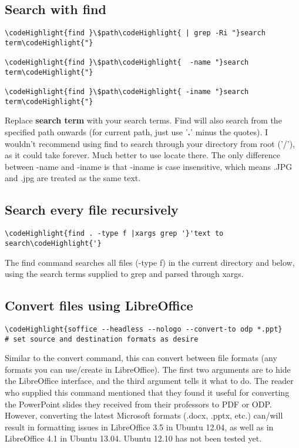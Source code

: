 \documentclass[12pt,a4paper]{article}
\begin{document}
\subsection{Search with find}
\begin{Verbatim}[commandchars=\\\{\}]
\codeHighlight{find }\$path\codeHighlight{ | grep -Ri "}search term\codeHighlight{"}

\codeHighlight{find }\$path\codeHighlight{  -name "}search term\codeHighlight{"}

\codeHighlight{find }\$path\codeHighlight{ -iname "}search term\codeHighlight{"}
\end{Verbatim}
Replace \textbf{search term} with your search terms.  Find will also search from the specified path onwards (for current path, just use '\textbf{.}' minus the quotes). I wouldn't recommend using find to search through your directory from root ('/'), as it could take forever. Much better to use locate there.  The only difference between -name and -iname is that -iname is case insensitive, which means .JPG and .jpg are treated as the same text.

\subsection{Search every file recursively}
\begin{Verbatim}[commandchars=\\\{\}]
\codeHighlight{find . -type f |xargs grep '}'text to search\codeHighlight{'}
\end{Verbatim}
The find command searches all files (-type f) in the current directory and below, using the search terms supplied to grep and parsed through xargs.

\subsection{Convert files using LibreOffice}
\begin{Verbatim}[commandchars=\\\{\}]
\codeHighlight{soffice --headless --nologo --convert-to odp *.ppt}
# set source and destination formats as desire
\end{Verbatim}
Similar to the convert command, this can convert between file formats (any formats you can use/create in LibreOffice). The first two arguments are to hide the LibreOffice interface, and the third argument tells it what to do.  The reader who supplied this command mentioned that they found it useful for converting the PowerPoint slides they received from their professors to PDF or ODP. However, converting the latest Microsoft formats (.docx, .pptx, etc.) can/will result in formatting issues in LibreOffice 3.5 in Ubuntu 12.04, as well as in LibreOffice 4.1 in Ubuntu 13.04. Ubuntu 12.10 has not been tested yet.
\end{document}
